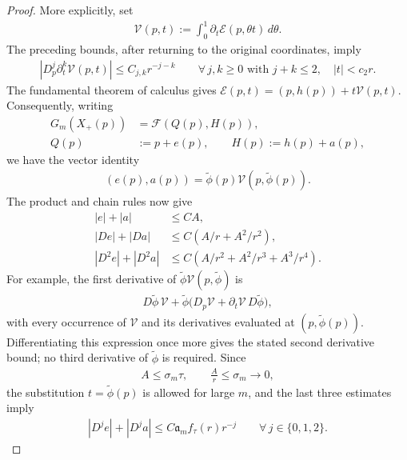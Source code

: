 \documentclass[a4paper,11pt,oneside,reqno]{amsart}
\numberwithin{equation}{section}
\theoremstyle{definition}
\begin{document}
\begin{proof}
    More explicitly, set
    \begin{align*}
        \mathcal V(p,t):=\int_0^1\partial_t\mathcal E(p,\theta t)
                    \,d\theta.
    \end{align*}
    The preceding bounds, after returning to the original
    coordinates, imply
    \begin{align*}
        |D_p^j\partial_t^k\mathcal V(p,t)|\leq C_{j,k}r^{-j-k}
        \qquad\forall\,j,k\geq0\text{ with }j+k\leq2,
        \quad |t|<c_2r.
    \end{align*}
    The fundamental theorem of calculus gives
    $\mathcal E(p,t)=(p,h(p))+t\mathcal V(p,t)$.
    Consequently, writing
    \begin{align*}
        G_m(X_+(p))&=\mathcal F(Q(p),H(p)),\\
        Q(p)&:=p+e(p),\qquad H(p):=h(p)+a(p),
    \end{align*}
    we have the vector identity
    \begin{align*}
        (e(p),a(p))
        =\widetilde\phi(p)\mathcal V(p,\widetilde\phi(p)).
    \end{align*}
    The product and chain rules now give
    \begin{align*}
        |e|+|a|&\leq CA,\\
        |De|+|Da|&\leq C(A/r+A^2/r^2),\\
        |D^2e|+|D^2a|
            &\leq C(A/r^2+A^2/r^3+A^3/r^4).
    \end{align*}
    For example, the first derivative of
    $\widetilde\phi\mathcal V(p,\widetilde\phi)$ is
    \begin{align*}
        D\widetilde\phi\,\mathcal V
        +\widetilde\phi\bigl(D_p\mathcal V
                   +\partial_t\mathcal V\,D\widetilde\phi\bigr),
    \end{align*}
    with every occurrence of $\mathcal V$ and its derivatives
    evaluated at $(p,\widetilde\phi(p))$.
    Differentiating this expression once more gives the
    stated second derivative bound; no third derivative
    of $\widetilde\phi$ is required.
    Since
    \begin{align*}
        A\leq\sigma_m\tau,\qquad
        \frac{A}{r}\leq\sigma_m\rightarrow0,
    \end{align*}
    the substitution $t=\widetilde\phi(p)$ is allowed for
    large $m$, and the last three estimates imply
    \begin{align}
        \label{eq:s4-outer-projection-estimates}
        |D^je|+|D^ja|
        \leq C\mathfrak a_m f_\tau(r)r^{-j}
        \qquad\forall\,j\in\{0,1,2\}.
    \end{align}


\end{proof}
\end{document}
